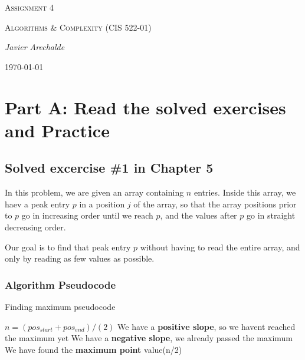 \documentclass{article}
\begin{document}
\begin{titlepage}
	\centering
	{\scshape\LARGE Assignment 4\par}
	\vspace{1cm}
	{\scshape\Large Algorithms \& Complexity (CIS 522-01)\par}
	\vspace{1.5cm}
	{\Large\itshape Javier Arechalde\par}
	\vfill
	{\large \today\par}
\end{titlepage}

\section*{Part A: Read the solved exercises and Practice}

\subsection*{Solved excercise \#1 in Chapter 5}

In this problem, we are given an array containing $n$ entries. Inside this array, we haev a peak entry $p$ in a position $j$ of the array, so that the array positions prior to $p$ go in increasing order until we reach $p$, and the values after $p$ go in straight decreasing order.

Our goal is to find that peak entry $p$ without having to read the entire array, and only by reading as few values as possible. 

\subsubsection*{Algorithm Pseudocode}

\begin{algorithm}[H]
\caption{Finding maximum pseudocode}
\begin{algorithmic}[1]
 \State $n = (pos_{start}+pos_{end})/(2)$
  \State We have a \textbf{positive slope}, so we havent reached the maximum yet
  \State {}
  \State We have a \textbf{negative slope}, we already passed the maximum
  \State {}
  \State We have found the \textbf{maximum point}
  \State \Return value(n/2)
 \EndIf
\EndFunction
\end{algorithmic}
\end{algorithm}
\end{document}
